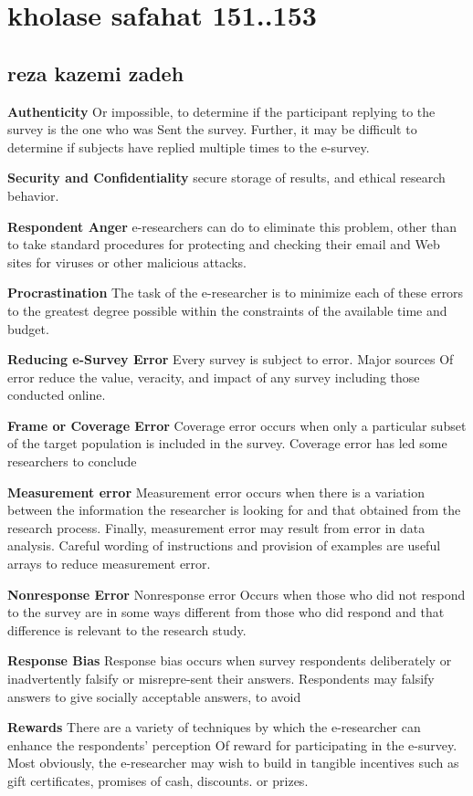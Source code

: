 \documentclass [7pt]{beamer}
\begin{document}
\small
\section*{kholase safahat 151..153 }
\subsection*{reza kazemi zadeh }	
\begin{frame}
\justifying	
\textbf{Authenticity} 
Or impossible, to determine if the participant replying to the survey is the one who was Sent the survey. Further, it may be difficult to determine if subjects have replied multiple times to the e-survey.

 
\textbf{Security and Confidentiality} 
secure storage of results, and ethical research behavior. 


\textbf{Respondent Anger} 
e-researchers can do to 
eliminate this problem, other than to take standard procedures for protecting and checking their 
email and Web sites for viruses or other malicious attacks.

 
\textbf{Procrastination} 
The task of the e-researcher is to minimize each of these errors to the greatest degree possible within the constraints of the available time and budget.
\end{frame}


\begin{frame}
\justifying
\textbf{Reducing e-Survey Error} 
Every survey is subject to error. 
Major sources Of error reduce the value, veracity, and impact of any survey including those conducted 
online.

 
\textbf{Frame or Coverage Error} 
Coverage error occurs when only a particular subset of the target population is included in the survey. Coverage error has led some researchers to conclude 


\textbf{Measurement error} 
Measurement error occurs when there is a variation between the information the researcher is looking for and that obtained from the research process. Finally, measurement error may result from error in data analysis. Careful wording of instructions and provision of examples are useful arrays to reduce measurement error. 
\end{frame}	

\begin{frame}
\justifying 
\textbf{Nonresponse Error} 
Nonresponse error Occurs when those who did not respond to the survey are in some ways different from those who did respond and that difference is relevant to the research study.

 
\textbf{Response Bias} 
Response bias occurs when survey respondents deliberately or inadvertently falsify or misrepre-sent their answers. Respondents may falsify answers to give socially acceptable answers, to avoid

 
\textbf{Rewards} There are a variety of techniques by which the e-researcher can enhance the respondents' perception Of reward for participating in the e-survey. Most obviously, the e-researcher may wish to build in tangible incentives such as gift certificates, promises of cash, discounts. or prizes. 

\end{frame}
\end{document}
